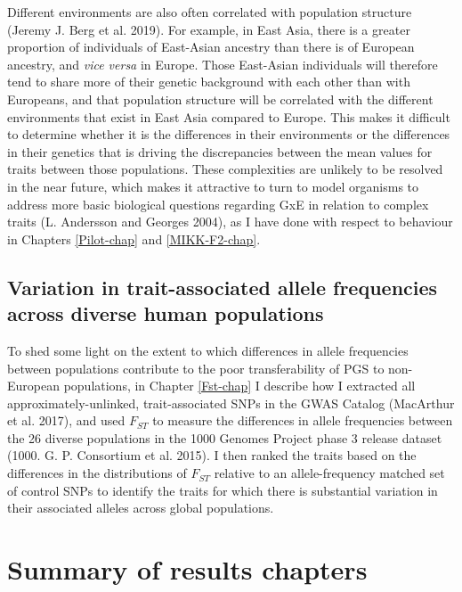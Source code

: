 \documentclass[
]{book}
\begin{document}
Different environments are also often correlated with population structure (Jeremy J. Berg et al. 2019). For example, in East Asia, there is a greater proportion of individuals of East-Asian ancestry than there is of European ancestry, and \emph{vice versa} in Europe. Those East-Asian individuals will therefore tend to share more of their genetic background with each other than with Europeans, and that population structure will be correlated with the different environments that exist in East Asia compared to Europe. This makes it difficult to determine whether it is the differences in their environments or the differences in their genetics that is driving the discrepancies between the mean values for traits between those populations. These complexities are unlikely to be resolved in the near future, which makes it attractive to turn to model organisms to address more basic biological questions regarding GxE in relation to complex traits (L. Andersson and Georges 2004), as I have done with respect to behaviour in Chapters \ref{Pilot-chap} and \ref{MIKK-F2-chap}.

\hypertarget{variation-in-trait-associated-allele-frequencies-across-diverse-human-populations}{%
\subsection{Variation in trait-associated allele frequencies across diverse human populations}\label{variation-in-trait-associated-allele-frequencies-across-diverse-human-populations}}

To shed some light on the extent to which differences in allele frequencies between populations contribute to the poor transferability of PGS to non-European populations, in Chapter \ref{Fst-chap} I describe how I extracted all approximately-unlinked, trait-associated SNPs in the GWAS Catalog (MacArthur et al. 2017), and used \(F_{ST}\) to measure the differences in allele frequencies between the 26 diverse populations in the 1000 Genomes Project phase 3 release dataset (1000. G. P. Consortium et al. 2015). I then ranked the traits based on the differences in the distributions of \(F_{ST}\) relative to an allele-frequency matched set of control SNPs to identify the traits for which there is substantial variation in their associated alleles across global populations.

\hypertarget{summary-of-results-chapters}{%
\section{Summary of results chapters}\label{summary-of-results-chapters}}
\end{document}
